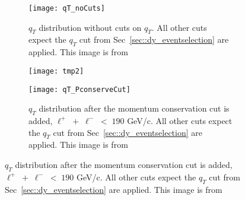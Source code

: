 \begin{figure}[h!t]
  \centering
  \begin{subfigure}{.46\textwidth}
    \centering \texttt{[image: qT\_noCuts]}
    \caption{$q_T$ distribution without cuts on $q_T$.  All other cuts expect
      the $q_T$ cut from Sec~\ref{sec::dy_eventselection} are applied.  This
      image is from~\cite{janthesis}}
    \label{fig::qT_noCuts}
  \end{subfigure}%
  \begin{subfigure}{.02\textwidth}
    \centering
    \texttt{[image: tmp2]}
    \label{fig::tmp2}%
  \end{subfigure}
  \begin{subfigure}{.46\textwidth}
    \centering \texttt{[image: qT\_PconserveCut]}
    \caption{$q_T$ distribution after the momentum conservation cut is added,
      $\ell^+ \; + \; \ell^- \; < \; 190$ GeV/c.  All other cuts expect the
      $q_T$ cut from Sec~\ref{sec::dy_eventselection} are applied.  This image
      is from~\cite{janthesis}}
    \label{fig::qT_PconserveCut}
  \end{subfigure}
\end{figure}

